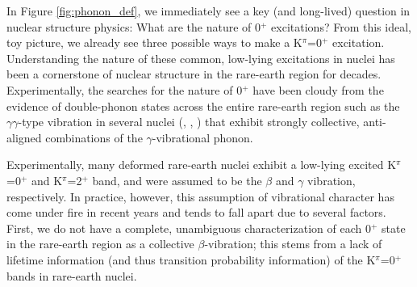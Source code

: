 % 

In Figure \ref{fig:phonon_def}, we immediately see a key (and long-lived) question in nuclear structure physics: What are the nature of 0$^+$ excitations? From this ideal, toy picture, we already see three possible ways to make a K$^\pi$=0$^+$ excitation. Understanding the nature of these common, low-lying excitations in nuclei has been a cornerstone of nuclear structure in the rare-earth region for decades. Experimentally, the searches for the nature of 0$^+$ have been cloudy from the evidence of double-phonon states across the entire rare-earth region such as the $\gamma\gamma$-type vibration in several nuclei (\cite{Garrett_twogammaEr_1997}, \cite{Lehmann_doublegamma168Er_1998}, \cite{Aprahamian2002}) that exhibit strongly collective, anti-aligned combinations of the $\gamma$-vibrational phonon.

Experimentally, many deformed rare-earth nuclei exhibit a low-lying excited K$^\pi$=0$^+$ and K$^\pi$=2$^+$ band, and were assumed to be the $\beta$ and $\gamma$ vibration, respectively. In practice, however, this assumption of vibrational character has come under fire in recent years and tends to fall apart due to several factors. First, we do not have a complete, unambiguous characterization of each 0$^+$ state in the rare-earth region as a collective $\beta$-vibration; this stems from a lack of lifetime information (and thus transition probability information) of the K$^\pi$=0$^+$ bands in rare-earth nuclei.

